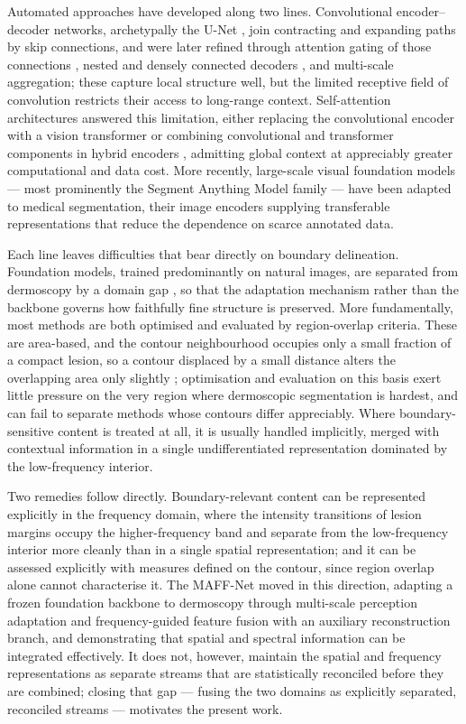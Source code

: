 Automated approaches have developed along two lines. Convolutional encoder--decoder networks, archetypally the U-Net \cite{ref4}, join contracting and expanding paths by skip connections, and were later refined through attention gating of those connections \cite{ref5}, nested and densely connected decoders \cite{ref6}, and multi-scale aggregation; these capture local structure well, but the limited receptive field of convolution restricts their access to long-range context. Self-attention architectures answered this limitation, either replacing the convolutional encoder with a vision transformer \cite{ref7} or combining convolutional and transformer components in hybrid encoders \cite{ref8}, admitting global context at appreciably greater computational and data cost. More recently, large-scale visual foundation models --- most prominently the Segment Anything Model family \cite{ref9,ref10} --- have been adapted to medical segmentation, their image encoders supplying transferable representations that reduce the dependence on scarce annotated data.

Each line leaves difficulties that bear directly on boundary delineation. Foundation models, trained predominantly on natural images, are separated from dermoscopy by a domain gap \cite{ref11}, so that the adaptation mechanism rather than the backbone governs how faithfully fine structure is preserved. More fundamentally, most methods are both optimised and evaluated by region-overlap criteria. These are area-based, and the contour neighbourhood occupies only a small fraction of a compact lesion, so a contour displaced by a small distance alters the overlapping area only slightly \cite{ref12}; optimisation and evaluation on this basis exert little pressure on the very region where dermoscopic segmentation is hardest, and can fail to separate methods whose contours differ appreciably. Where boundary-sensitive content is treated at all, it is usually handled implicitly, merged with contextual information in a single undifferentiated representation dominated by the low-frequency interior.

Two remedies follow directly. Boundary-relevant content can be represented explicitly in the frequency domain, where the intensity transitions of lesion margins occupy the higher-frequency band \cite{ref13,ref14} and separate from the low-frequency interior more cleanly than in a single spatial representation; and it can be assessed explicitly with measures defined on the contour, since region overlap alone cannot characterise it. The MAFF-Net \cite{ref15} moved in this direction, adapting a frozen foundation backbone to dermoscopy through multi-scale perception adaptation and frequency-guided feature fusion with an auxiliary reconstruction branch, and demonstrating that spatial and spectral information can be integrated effectively. It does not, however, maintain the spatial and frequency representations as separate streams that are statistically reconciled before they are combined; closing that gap --- fusing the two domains as explicitly separated, reconciled streams --- motivates the present work.

